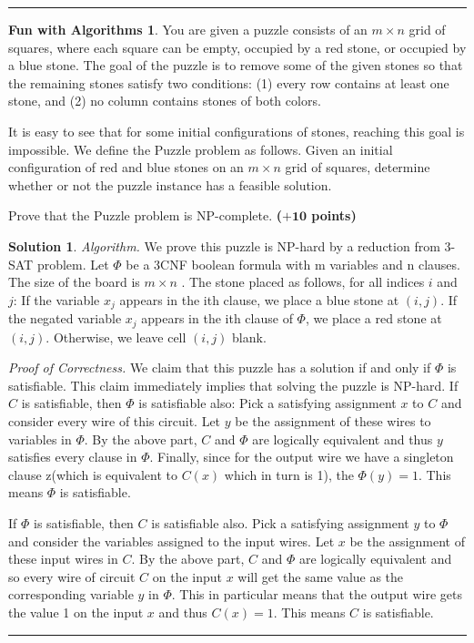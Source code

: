 \documentclass{article}
\theoremstyle{definition}
\newtheorem*{fun}{Fun with Algorithms}
\def\fline{\rule{0.75\linewidth}{0.5pt}}
\newcommand{\finishline}{\begin{center}\fline\end{center}}
\newtheorem*{solution*}{Solution}
\newenvironment{solution}{\begin{solution*}}{{\finishline} \end{solution*}}
\newcommand{\grade}[1]{\hfill{\textbf{($\mathbf{#1}$ points)}}}
\begin{document}
\finishline


\begin{fun}
	You are given a puzzle consists of an $m \times n$ grid of squares, where each
square can be empty, occupied by a red stone, or occupied by a blue stone. The goal of the puzzle
is to remove some of the given stones so that the remaining stones satisfy two conditions: (1) every row contains at least one stone,
and (2) no column contains stones of both colors. 

It is easy to see that for some initial configurations of stones, reaching this goal is impossible. 
We define the Puzzle problem as follows. Given an initial configuration of red and blue stones on an $m \times n$ grid of squares,
determine whether or not the puzzle instance has a feasible solution. 

Prove that the Puzzle problem is NP-complete. \grade{+10}

\begin{solution}
	 
	\emph{Algorithm.} We prove this puzzle is NP-hard by a reduction from 3-SAT problem. Let $\Phi$ be a 3CNF boolean formula with m variables and n clauses. The size of the board is $m \times n$ . The stone placed as follows, for all indices $i$ and $j$: If the variable $x_j$ appears in the ith clause, we place a blue stone at $(i, j)$. If the negated variable $x_j$ appears in the ith clause of $\Phi$, we place a red stone at $(i,j)$. Otherwise, we leave cell $(i, j)$ blank.
	
	\emph{Proof of Correctness.} We claim that this puzzle has a solution if and only if $\Phi$ is satisfiable. This claim immediately implies that solving the puzzle is NP-hard. If $C$ is satisfiable, then $\Phi$ is satisfiable also:  Pick a satisfying assignment $x$ to $C$ and consider every wire of this circuit.  Let $y$ be the assignment of these wires to variables in $\Phi$.  By the above part, $C$ and $\Phi$ are logically equivalent and thus $y$ satisfies every clause in $\Phi$.  Finally, since for the output wire we have a singleton clause z(which is equivalent to $C(x)$ which in turn is 1), the $\Phi(y) = 1$.  This means $\Phi$ is satisfiable.
	
	If  $\Phi$  is  satisfiable,  then $C$ is  satisfiable  also.   Pick  a  satisfying  assignment $y$ to  $\Phi$  and  consider  the variables assigned to the input wires.  Let $x$ be the assignment of these input wires in $C$.  By the above part, $C$ and $\Phi$ are logically equivalent and so every wire of circuit $C$ on the input $x$ will get the same value as the corresponding variable $y$ in $\Phi$.  This in particular means that the output wire gets the value 1 on the input $x$ and thus $C(x) = 1$.  This means $C$ is satisfiable. \\


\end{solution}
\end{fun}
\end{document}
